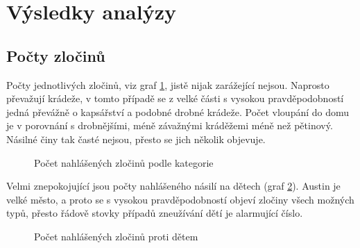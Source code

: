 \documentclass{article}
\begin{document}
\section{Výsledky analýzy}

\subsection{Počty zločinů}

Počty jednotlivých zločinů, viz graf \ref{fig:crime_counts}, jistě nijak zarážející nejsou. Naprosto
převažují krádeže, v tomto případě se z velké části s vysokou pravděpodobností jedná převážně o kapsářství
a podobné drobné krádeže. Počet vloupání do domu je v porovnání s drobnějšími, méně závažnými kráděžemi méně
než pětinový. Násilné činy tak časté nejsou, přesto se jich několik objevuje.

\begin{figure}
  \centering
  \caption{Počet nahlášených zločinů podle kategorie}
  \label{fig:crime_counts}
\end{figure}

Velmi znepokojující jsou počty nahlášeného násilí na dětech (graf \ref{fig:crime_against_children}).
Austin je velké město, a proto se s vysokou pravděpodobností objeví zločiny všech možných typů,
přesto řádově stovky případů zneužívání dětí je alarmující číslo.

\begin{figure}
  \centering
  \caption{Počet nahlášených zločinů proti dětem}
  \label{fig:crime_against_children}
\end{figure}
\end{document}
